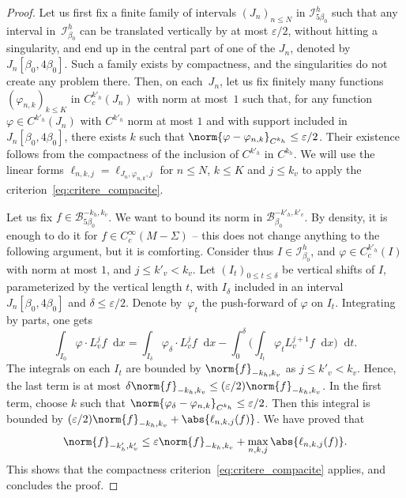 \documentclass[JEP,XML,SOM,Unicode]{cedram}
\newcommand{\boI}{\mathcal{I}}
\newcommand{\boB}{\mathcal{B}}
\newcommand{\dd}{\mathop{}\!\mathrm{d}}
\newcommand{\paregg}[1]{\biggl(#1\biggr)}
\let\epsilon\varepsilon
\let\phi\varphi
\theoremstyle{definition}
\numberwithin{equation}{section}
\begin{document}
\begin{proof}
Let us first fix a finite family of intervals $(J_n)_{n\leq N}$ in
$\boI^h_{5\beta_0}$ such that any interval in~$\boI^h_{\beta_0}$ can be
translated vertically by at most $\epsilon/2$, without hitting a singularity,
and end up in the central part of one of the $J_n$, denoted by
$J_n[\beta_0,4\beta_0]$. Such a family exists by compactness, and the
singularities do not create any problem there. Then, on each~$J_n$, let us
fix finitely many functions $(\phi_{n,k})_{k\leq K}$ in $C^{k'_h}_c(J_n)$
with norm at most~$1$ such that, for any function $\phi \in C^{k'_h}(J_n)$
with $C^{k'_h}$ norm at most $1$ and with support included in $J_n[\beta_0,
4\beta_0]$, there exists $k$ such that $\norm{\phi - \phi_{n,k}}_{C^{k_h}}
\leq \epsilon/2$. Their existence follows from the compactness of the
inclusion of $C^{k'_h}$ in $C^{k_h}$. We will use the linear forms
$\ell_{n,k,j} = \ell_{J_n, \phi_{n,k}, j}$ for $n \leq N$, $k \leq K$ and $j
\leq k_v$ to apply the criterion~\eqref{eq:critere_compacite}.

Let us fix $f \in \boB^{-k_h, k_v}_{5\beta_0}$. We want to bound its norm in
$\boB^{-k'_h, k'_v}_{\beta_0}$. By density, it is enough to do it for $f \in
C^\infty_c(M-\Sigma)$ -- this does not change anything to the following
argument, but it is comforting. Consider thus $I \in \boI^h_{\beta_0}$, and
$\phi \in C_c^{k'_h}(I)$ with norm at most $1$, and $j \leq k'_v < k_v$. Let
$(I_t)_{0 \leq t \leq \delta}$ be vertical shifts of $I$, parameterized by
the vertical length $t$, with $I_\delta$ included in an interval
$J_n[\beta_0,4\beta_0]$ and $\delta \leq \epsilon/2$. Denote by~$\phi_t$ the
push-forward of $\phi$ on $I_t$. Integrating by parts, one gets
\begin{equation*}
\int_{I_0} \phi\cdot L_v^j f \dd x = \int_{I_\delta} \phi_\delta \cdot L_v^j f \dd x
-\int_0^\delta \paregg{\int_{I_t} \phi_t L_v^{j+1}f \dd x} \dd t.
\end{equation*}
The integrals on each $I_t$ are bounded by $\norm{f}_{-k_h, k_v}$ as $j\leq
k'_v < k_v$. Hence, the last term is at most $\delta \norm{f}_{-k_h, k_v}
\leq (\epsilon/2) \norm{f}_{-k_h, k_v}$. In the first term, choose $k$ such
that $\norm{\phi_\delta - \phi_{n, k}}_{C^{k_h}} \leq \epsilon/2$. Then this
integral is bounded by $(\epsilon/2)\norm{f}_{-k_h, k_v} +
\abs{\ell_{n,k,j}(f)}$. We have proved that
\begin{equation*}
\norm{f}_{-k'_h, k'_v} \leq \epsilon \norm{f}_{-k_h, k_v} + \max_{n,k,j} \abs{\ell_{n,k,j}(f)}.
\end{equation*}
This shows that the compactness criterion~\eqref{eq:critere_compacite}
applies, and concludes the proof.
\end{proof}
\end{document}
